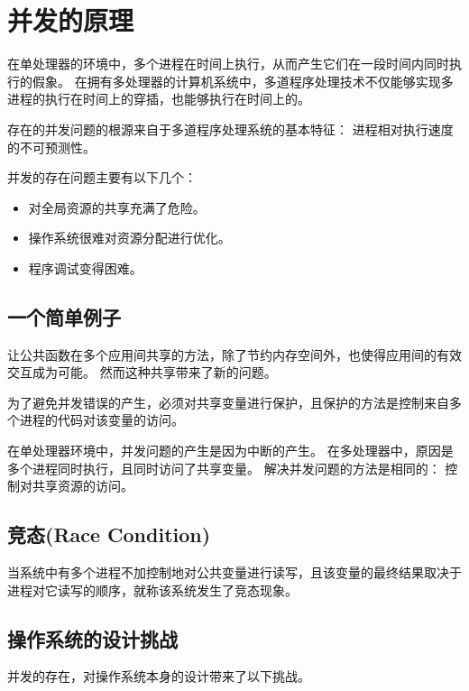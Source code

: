 
\section{并发的原理}
{
    在单处理器的环境中，多个进程在时间上执行，从而产生它们在一段时间内同时执行的假象。
    在拥有多处理器的计算机系统中，多道程序处理技术不仅能够实现多进程的执行在时间上的穿插，也能够执行在时间上的。

    存在的并发问题的根源来自于多道程序处理系统的基本特征：
    进程相对执行速度的不可预测性。

    并发的存在问题主要有以下几个：

    \begin{itemize}
        \item 对全局资源的共享充满了危险。
        \item 操作系统很难对资源分配进行优化。
        \item 程序调试变得困难。
    \end{itemize}

    \subsection{一个简单例子}
    {
        让公共函数在多个应用间共享的方法，除了节约内存空间外，也使得应用间的有效交互成为可能。
        然而这种共享带来了新的问题。

        为了避免并发错误的产生，必须对共享变量进行保护，且保护的方法是控制来自多个进程的代码对该变量的访问。

        在单处理器环境中，并发问题的产生是因为中断的产生。
        在多处理器中，原因是多个进程同时执行，且同时访问了共享变量。
        解决并发问题的方法是相同的：
        控制对共享资源的访问。
    }

    \subsection{竞态(Race Condition)}
    {
        当系统中有多个进程不加控制地对公共变量进行读写，且该变量的最终结果取决于进程对它读写的顺序，就称该系统发生了竞态现象。
    }

    \subsection{操作系统的设计挑战}
    {
        并发的存在，对操作系统本身的设计带来了以下挑战。

}}
